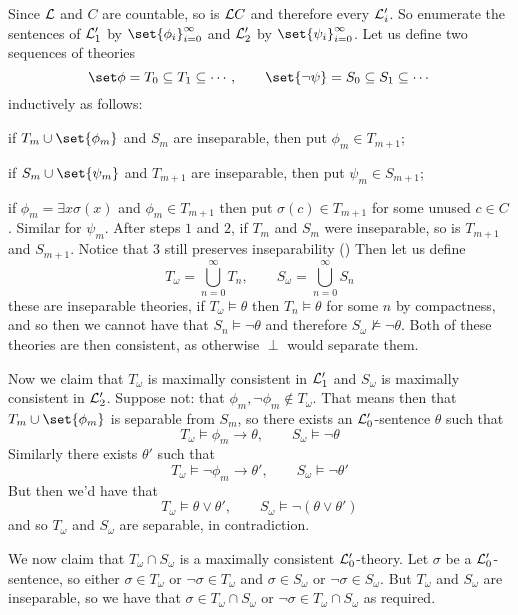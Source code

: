 Since ${\cal L}$ and $C$ are countable, so is ${\cal L}C$ and therefore every ${\cal L}'_i$.
So enumerate the sentences of ${\cal L}'_1$ by $\set{\phi_i}_{i=0}^\infty$ and ${\cal L}'_2$ by $\set{\psi_i}_{i=0}^\infty$.
Let us define two sequences of theories
$$ \set\phi = T_0 \subseteq T_1 \subseteq \cdots,\qquad \set{\neg\psi} = S_0 \subseteq S_1 \subseteq \cdots $$
inductively as follows:
\benum
    \item if $T_m\cup\set{\phi_m}$ and $S_m$ are inseparable, then put $\phi_m\in T_{m+1}$;
    \item if $S_m\cup\set{\psi_m}$ and $T_{m+1}$ are inseparable, then put $\psi_m\in S_{m+1}$;
    \item if $\phi_m=\exists x\sigma(x)$ and $\phi_m\in T_{m+1}$ then put $\sigma(c)\in T_{m+1}$ for some unused $c\in C$.
    Similar for $\psi_m$.
\eenum
After steps $1$ and $2$, if $T_m$ and $S_m$ were inseparable, so is $T_{m+1}$ and $S_{m+1}$.
Notice that $3$ still preserves inseparability ()
Then let us define
$$ T_\omega = \bigcup_{n=0}^\infty T_n,\qquad S_\omega = \bigcup_{n=0}^\infty S_n $$
these are inseparable theories, if $T_\omega\vDash\theta$ then $T_n\vDash\theta$ for some $n$ by compactness, and so then we cannot have that $S_n\vDash\neg\theta$ and therefore $S_\omega\nvDash\neg\theta$.
Both of these theories are then consistent, as otherwise $\perp$ would separate them.

Now we claim that $T_\omega$ is maximally consistent in ${\cal L}'_1$ and $S_\omega$ is maximally consistent in ${\cal L}'_2$.
Suppose not: that $\phi_m,\neg\phi_m\notin T_\omega$.
That means then that $T_m\cup\set{\phi_m}$ is separable from $S_m$, so there exists an ${\cal L}'_0$-sentence $\theta$ such that
$$ T_\omega\vDash\phi_m\to\theta,\qquad S_\omega\vDash\neg\theta $$
Similarly there exists $\theta'$ such that
$$ T_\omega\vDash\neg\phi_m\to\theta',\qquad S_\omega\vDash\neg\theta' $$
But then we'd have that
$$ T_\omega\vDash\theta\lor\theta',\qquad S_\omega\vDash\neg(\theta\lor\theta') $$
and so $T_\omega$ and $S_\omega$ are separable, in contradiction.

We now claim that $T_\omega\cap S_\omega$ is a maximally consistent ${\cal L}'_0$-theory.
Let $\sigma$ be a ${\cal L}'_0$-sentence, so either $\sigma\in T_\omega$ or $\neg\sigma\in T_\omega$ and $\sigma\in S_\omega$ or $\neg\sigma\in S_\omega$.
But $T_\omega$ and $S_\omega$ are inseparable, so we have that $\sigma\in T_\omega\cap S_\omega$ or $\neg\sigma\in T_\omega\cap S_\omega$ as required.

